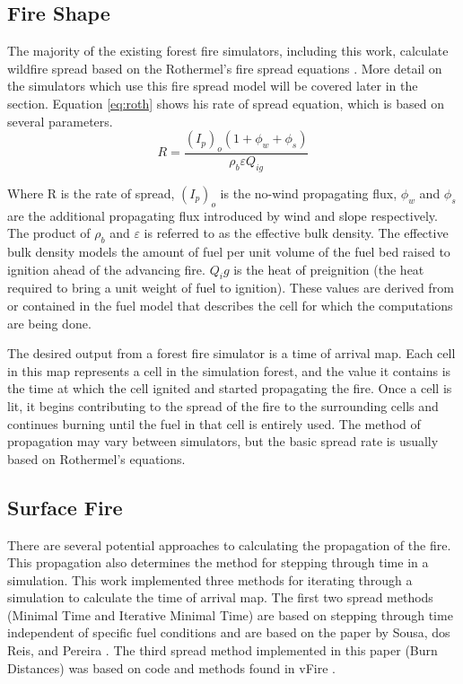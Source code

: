 \subsection{Fire Shape}
The majority of the existing forest fire simulators, including this work, calculate wildfire spread based on the Rothermel's fire spread equations \cite{roth}. More detail on the simulators which use this fire spread model will be covered later in the section. Equation \ref{eq:roth} shows his rate of spread equation, which is based on several parameters. 
\begin{equation} \label{eq:roth}
R = \frac{(I_{p})_{o}(1 + \phi_{w} + \phi_{s})}{\rho_{b}\varepsilon Q_{ig}}
\end{equation}

Where R is the rate of spread, $(I_p)_o$ is the no-wind propagating flux, $\phi_w$ and $\phi_s$ are the additional propagating flux introduced by wind and slope respectively. The product of $\rho_b$ and $\varepsilon$ is referred to as the effective bulk density. The effective bulk density models the amount of fuel per unit volume of the fuel bed raised to ignition ahead of the advancing fire. $Q_ig$ is the heat of preignition (the heat required to bring a unit weight of fuel to ignition). These values are derived from or contained in the fuel model that describes the cell for which the computations are being done. 

The desired output from a forest fire simulator is a time of arrival map. Each cell in this map represents a cell in the simulation forest, and the value it contains is the time at which the cell ignited and started propagating the fire. Once a cell is lit, it begins contributing to the spread of the fire to the surrounding cells and continues burning until the fuel in that cell is entirely used. The method of propagation may vary between simulators, but the basic spread rate is usually based on Rothermel's equations.

\subsection{Surface Fire}
There are several potential approaches to calculating the propagation of the fire. This propagation also determines the method for stepping through time in a simulation. This work implemented three methods for iterating through a simulation to calculate the time of arrival map. The first two spread methods (Minimal Time and Iterative Minimal Time) are based on stepping through time independent of specific fuel conditions and are based on the paper by Sousa, dos Reis, and Pereira \cite{gpufire}. The third spread method implemented in this paper (Burn Distances) was based on code and methods found in vFire \cite{vFire}. 

